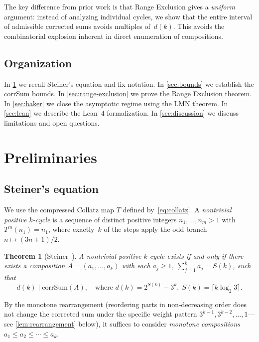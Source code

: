 \documentclass[11pt, a4paper]{amsart}
\theoremstyle{plain}
\newtheorem{theorem}{Theorem}[section]
\theoremstyle{definition}
\theoremstyle{remark}
\newcommand{\corrSum}{\mathrm{corrSum}}
\begin{document}
The key difference from prior work is that Range Exclusion gives
a \emph{uniform} argument: instead of analyzing individual cycles,
we show that the entire interval of admissible corrected sums avoids
multiples of~$d(k)$.  This avoids the combinatorial explosion
inherent in direct enumeration of compositions.

\subsection{Organization}\label{ssec:organization}

In \cref{sec:prelim} we recall Steiner's equation and fix notation.
In \cref{sec:bounds} we establish the corrSum bounds.
In \cref{sec:range-exclusion} we prove the Range Exclusion theorem.
In \cref{sec:baker} we close the asymptotic regime using the LMN theorem.
In \cref{sec:lean} we describe the Lean~4 formalization.
In \cref{sec:discussion} we discuss limitations and open questions.

\section{Preliminaries}\label{sec:prelim}

\subsection{Steiner's equation}\label{ssec:steiner}

We use the compressed Collatz map $T$ defined by~\eqref{eq:collatz}.
A \emph{nontrivial positive $k$-cycle} is a sequence of distinct
positive integers $n_1, \ldots, n_m > 1$ with $T^m(n_1) = n_1$,
where exactly~$k$ of the steps apply the odd branch
$n \mapsto (3n+1)/2$.

\begin{theorem}[Steiner~\cite{Steiner1977}]\label{thm:steiner}
  A nontrivial positive $k$-cycle exists if and only if
  there exists a composition $A = (a_1, \ldots, a_k)$ with
  each $a_j \geq 1$, $\sum_{j=1}^k a_j = S(k)$, such that
  \begin{equation}\label{eq:steiner}
    d(k) \;\Big|\; \corrSum(A),
    \quad\text{where } d(k) = 2^{S(k)} - 3^k,\;
    S(k) = \lceil k \log_2 3 \rceil.
  \end{equation}
\end{theorem}

By the monotone rearrangement (reordering parts in non-decreasing order
does not change the corrected sum under the specific weight pattern
$3^{k-1}, 3^{k-2}, \ldots, 1$---see \cref{lem:rearrangement} below),
it suffices to consider \emph{monotone compositions}
$a_1 \leq a_2 \leq \cdots \leq a_k$.
\end{document}
